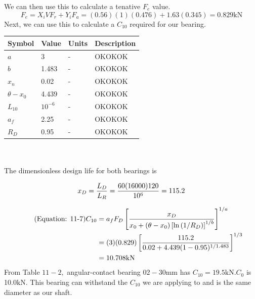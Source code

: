 \documentclass[letterpaper,12pt]{article}
\begin{document}
\noindent We can then use this to calculate a tenative $F_e$ value.
\begin{equation}
F _ { e } = X _ { i } V F _ { r } + Y _ { i } F _ { a } = ( 0.56 ) ( 1 )( 0.476 ) + 1.63 ( 0.345 ) = 0.829 \mathrm{kN} \tag{Equation: 11-2}
\end{equation}
Next, we can use this to calculate a $C_{10}$ required for our bearing.

\begin{tabular}{ |p{1.5cm}||p{1.2cm}|p{2cm}|p{7cm}|  }
		\hline
		Symbol & Value & Units & Description\\
		\hline
		$a$ & 3 & - & OKOKOK \\
        $b$ & 1.483 & -  & OKOKOK\\			
	    $x_n$ & 0.02 & -  & OKOKOK\\
	    $\theta - x _ { 0 }$ & 4.439 & -  & OKOKOK\\
	    $L _ { 10 }$ & $10^{-6}$ & -  & OKOKOK\\
	    $a _ { f }$ & 2.25 & -  & OKOKOK\\
	    $R _ { D }$ & 0.95 & -  & OKOKOK\\

	    \hline
\end{tabular}\\ \\
%

The dimensionless design life for both bearings is

\begin{equation}
x _ { D } = \frac { L _ { D } } { L _ { R } } = \frac { 60 ( 16000 ) 120 } { 10 ^ { 6 } } = 115.2 \notag
\end{equation}

\begin{align}
    \tag{Equation: 11-7}
   C _ { 10 } &= a _ { f } F _ { D } \left[ \frac { x _ { D } } { x _ { 0 } + \left( \theta - x _ { 0 } \right) \left[ \ln \left( 1 / R _ { D } \right) \right] ^ { 1 / b } } \right] ^ { 1 / a }\\ \notag
   &= ( 3 ) ( 0.829 ) \left[ \frac { 115.2 } { 0.02 + 4.439 ( 1 - 0.95 ) ^ { 1 / 1.483 } } \right] ^ { 1 / 3 }\\ \notag
   &= 10.708 \mathrm { kN } 
\end{align}
\noindent From Table $11 - 2 ,$ angular-contact bearing $02 - 30 \mathrm { mm }$ has $C _ { 10 } = 19.5 \mathrm { kN } . C _ { 0 }$ is 10.0$\mathrm { kN }$. This bearing can withstand the $C_{10}$ we are applying to and is the same diameter as our shaft. \\
\end{document}
